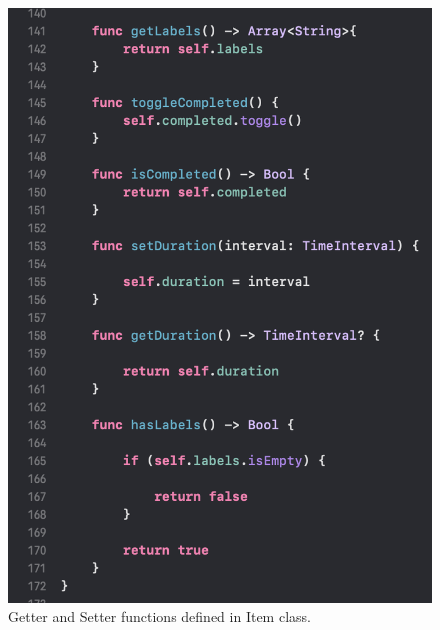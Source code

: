 \begin{figure}[H]
    \centering
    \includegraphics[width=\textwidth]{./graphics/Implementation/Dashboard/item4.png}
    \caption{Getter and Setter functions defined in Item class.}
    \label{fig:item4}
\end{figure}